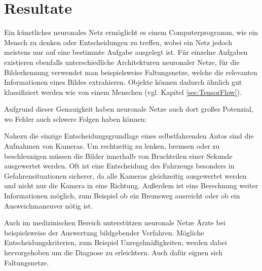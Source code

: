 \documentclass[12pt,a4]{article}
\begin{document}
\section{Resultate}
Ein künstliches neuronales Netz ermöglicht es einem Computerprogramm, wie ein Mensch zu denken oder Entscheidungen zu treffen, wobei ein Netz jedoch meistens nur auf eine bestimmte Aufgabe ausgelegt ist. Für einzelne Aufgaben existieren ebenfalls unterschiedliche Architekturen neuronaler Netze, für die Bilderkennung verwendet man beispielsweise Faltungsnetze, welche die relevanten Informationen eines Bildes extrahieren. Objekte können dadurch ähnlich gut klassifiziert werden wie von einem Menschen (vgl. Kapitel \ref{sec:TensorFlow}).

Aufgrund dieser Genauigkeit haben neuronale Netze auch dort großes Potenzial, wo Fehler auch schwere Folgen haben können:

Nahezu die einzige Entscheidungsgrundlage eines selbstfahrenden Autos sind die Aufnahmen von Kameras. Um rechtzeitig zu lenken, bremsen oder zu beschleunigen müssen die Bilder innerhalb von Bruchteilen einer Sekunde ausgewertet werden. Oft ist eine Entscheidung des Fahrzeugs besonders in Gefahrensituationen sicherer, da alle Kameras gleichzeitig ausgewertet werden und nicht nur die Kamera in eine Richtung. Außerdem ist eine Berechnung weiter Informationen möglich, zum Beispiel ob ein Bremsweg ausreicht oder ob ein Ausweichmaneuver nötig ist.

Auch im medizinischen Bereich unterstützen neuronale Netze Ärzte bei beispielsweise der Auswertung bildgebender Verfahren. Mögliche Entscheidungskriterien, zum Beispiel Unregelmäßigkeiten, werden dabei hervorgehoben um die Diagnose zu erleichtern. Auch dafür eignen sich Faltungsnetze. \cite{HelpInMedicine}



\clearpage
\printindex
\end{document}
